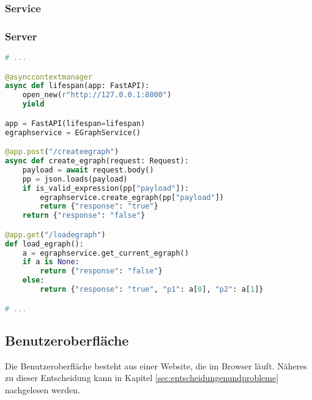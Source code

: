 \subsubsection{Service}





\subsubsection{Server}

\begin{lstlisting}[language=Python, caption=Auszug aus der Datei \textit{server.py}]
# ... 

@asynccontextmanager
async def lifespan(app: FastAPI):
    open_new(r"http://127.0.0.1:8000")
    yield

app = FastAPI(lifespan=lifespan)
egraphservice = EGraphService()

@app.post("/createegraph")
async def create_egraph(request: Request):
    payload = await request.body()
    pp = json.loads(payload)
    if is_valid_expression(pp["payload"]):
        egraphservice.create_egraph(pp["payload"])
        return {"response": "true"}
    return {"response": "false"}

@app.get("/loadegraph")
def load_egraph():
    a = egraphservice.get_current_egraph()
    if a is None:
        return {"response": "false"}
    else:
        return {"response": "true", "p1": a[0], "p2": a[1]}

# ... 
\end{lstlisting} 


\subsection{Benutzeroberfläche}

Die Benutzeroberfläche besteht aus einer Website, die im Browser läuft. Näheres zu dieser Entscheidung kann in Kapitel \ref{sec:entscheidungenundprobleme} nachgelesen werden.



